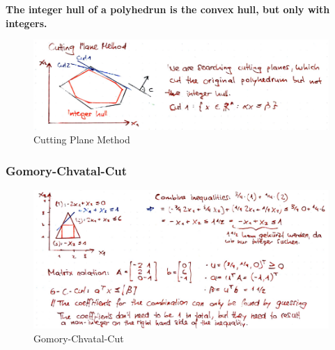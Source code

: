 \textbf{The integer hull of a polyhedrun is the convex hull, but only with integers.}

\begin{figure}[H]
\centering
\includegraphics[width=1\textwidth]{figures/cuttingplanemethod.png}
\caption{Cutting Plane Method}
\end{figure}

\subsubsection{Gomory-Chvatal-Cut}

\begin{figure}[H]
\centering
\includegraphics[width=1\textwidth]{figures/gomory.png}
\caption{Gomory-Chvatal-Cut}
\end{figure}

\clearpage